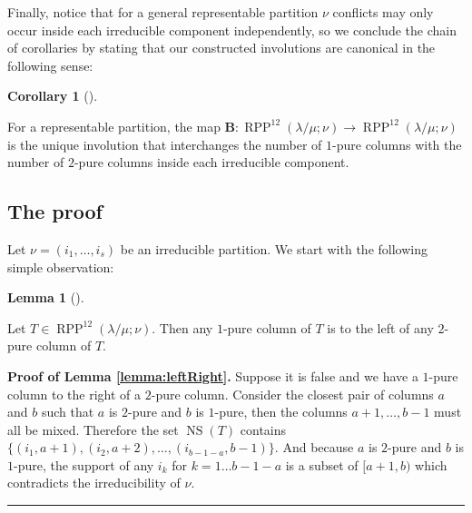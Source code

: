 \documentclass[numbers=enddot,12pt,final,onecolumn,notitlepage]{scrartcl}%
\theoremstyle{definition}
\newtheorem{lem}[theo]{Lemma}
\newenvironment{lemma}[1][]
{\begin{lem}[#1]\begin{leftbar}}
{\end{leftbar}\end{lem}}
\newtheorem{coro}[theo]{Corollary}
\newenvironment{corollary}[1][]
{\begin{coro}[#1]\begin{leftbar}}
{\end{leftbar}\end{coro}}
\newenvironment{proof}[1][Proof]{\noindent\textbf{#1.} }{\ \rule{0.5em}{0.5em}}
\def\seplistvar{{{\nu}}} %
\def\NS{{\operatorname*{NS}}}
\def\OneTwoRPPCutvar{{\operatorname*{RPP}^{12}\left(  \lambda/\mu ;\seplistvar \right)}}
\begin{document}
Finally, notice that for a general representable partition $\seplistvar$ conflicts may only occur inside each irreducible component independently, so we conclude the chain of corollaries by stating that our constructed involutions are canonical in the following sense:

\begin{corollary}
 For a representable partition, the map $\mathbf{B}:\OneTwoRPPCutvar\to\OneTwoRPPCutvar$ is the unique involution that interchanges the number of $1$-pure columns with the number of $2$-pure columns inside each irreducible component.
\end{corollary}

\subsection{The proof}
Let $\seplistvar=(i_1,\dots,i_s)$ be an irreducible partition. We start with the following simple observation:
\begin{lemma}
\label{lemma:leftRight}
 Let $T\in\OneTwoRPPCutvar$. Then any $1$-pure column of $T$ is to the left of any $2$-pure column of $T$.
\end{lemma}
\begin{proof}[Proof of Lemma \ref{lemma:leftRight}]
Suppose it is false and we have a $1$-pure column to the right of a $2$-pure column. Consider the closest pair of columns $a$ and $b$ such that $a$ is $2$-pure and $b$ is $1$-pure, then the columns $a+1,\dots,b-1$ must all be mixed. %
Therefore the set $\NS(T)$ contains $\{(i_1,a+1),(i_2,a+2),\dots,(i_{b-1-a},b-1)\}$. And because $a$ is $2$-pure and $b$ is $1$-pure, the support of any $i_k$ for $k=1\dots b-1-a$ is a subset of $[a+1,b)$ which contradicts the irreducibility of $\seplistvar$.
\end{proof}
\end{document}
